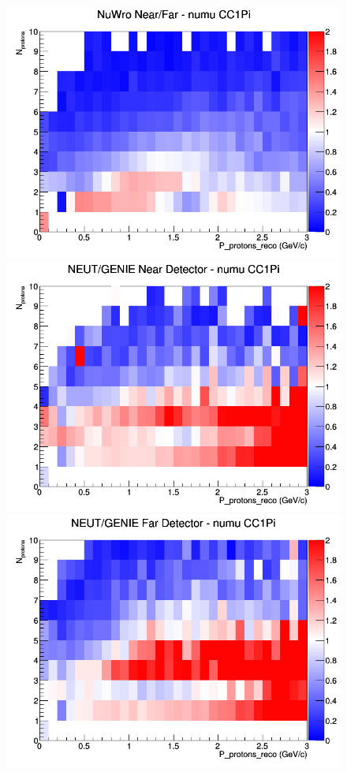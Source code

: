 \begin{figure}[h]
\endminipage
{}
\includegraphics[width=\linewidth]{eff_N_P/FGT/protons/ratios/CC1Pi_NuWro_numu_NF_N_P.png}
\endminipage
\newline
{}
\includegraphics[width=\linewidth]{eff_N_P/FGT/protons/ratios/CC1Pi_NEUT_GENIE_numu_near_N_P.png}
\endminipage
{}
\includegraphics[width=\linewidth]{eff_N_P/FGT/protons/ratios/CC1Pi_NEUT_GENIE_numu_far_N_P.png}

\end{figure}
